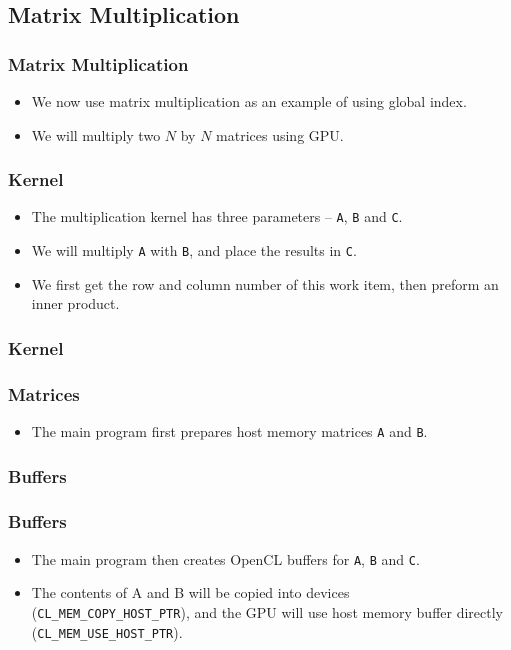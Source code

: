 \documentclass{beamer}
\begin{document}
\subsection{Matrix Multiplication}

\begin{frame}
  \frametitle{Matrix Multiplication} 
  \begin{itemize}
    \item We now use matrix multiplication as an example of using
      global index.
    \item We will multiply two $N$ by $N$ matrices using GPU.
  \end{itemize}
\end{frame}

\begin{frame}
  \frametitle{Kernel}
  \begin{itemize}
    \item The multiplication kernel has three parameters -- {\tt A},
      {\tt B} and {\tt C}.
    \item We will multiply {\tt A} with {\tt B}, and place the results
      in {\tt C}.
    \item We first get the row and column number of this work item,
      then preform an inner product.
  \end{itemize}
\end{frame}

\begin{frame}
  \frametitle{Kernel}
\end{frame}

\begin{frame}
  \frametitle{Matrices}
  \begin{itemize}
    \item The main program first prepares host memory matrices {\tt A}
      and {\tt B}.
  \end{itemize}
\end{frame}

\begin{frame}
  \frametitle{Buffers}
\end{frame}

\begin{frame}
  \frametitle{Buffers}
  \begin{itemize}
    \item The main program then creates OpenCL buffers for {\tt A},
      {\tt B} and {\tt C}.
    \item The contents of A and B will be copied into devices
      ({\tt CL\_MEM\_COPY\_HOST\_PTR}), and the GPU will use host memory buffer
      directly ({\tt CL\_MEM\_USE\_HOST\_PTR}).
  \end{itemize}
\end{frame}
\end{document}

